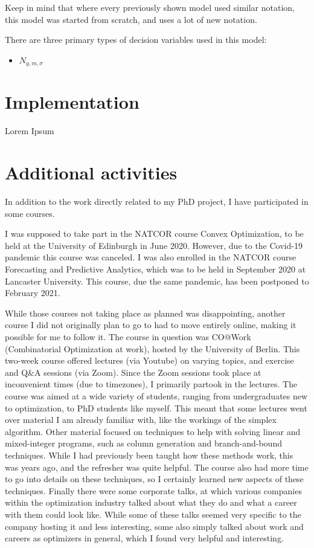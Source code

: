 \documentclass[a4paper,12pt]{article}
\begin{document}
Keep in mind that where every previously shown model used similar notation, this model was started from scratch, and uses a lot of new notation. 

There are three primary types of decision variables used in this model:

\begin{itemize}
\item $N_{y,m,\sigma}$ %
\end{itemize}

\pagebreak

\section{Implementation}\label{s:impl}
Lorem Ipsum 

\pagebreak

\section{Additional activities} \label{s:addit} %
In addition to the work directly related to my PhD project, I have participated in some courses. 

I was supposed to take part in the NATCOR course Convex Optimization, to be held at the University of Edinburgh in June 2020. However, due to the Covid-19 pandemic this course was canceled. I was also enrolled in the NATCOR course Forecasting and Predictive Analytics, which was to be held in September 2020 at Lancaster University. This course, due the same pandemic, has been postponed to February 2021. 

\bigskip

While those courses not taking place as planned was disappointing, another course I did not originally plan to go to had to move entirely online, making it possible for me to follow it. The course in question was CO@Work (Combinatorial Optimization at work), hosted by the University of Berlin. This two-week course offered lectures (via Youtube) on varying topics, and exercise and Q\&A sessions (via Zoom). Since the Zoom sessions took place at inconvenient times (due to timezones), I primarily partook in the lectures. The course was aimed at a wide variety of students, ranging from undergraduates new to optimization, to PhD students like myself. This meant that some lectures went over material I am already familiar with, like the workings of the simplex algorithm. Other material focused on techniques to help with solving linear and mixed-integer programs, such as column generation and branch-and-bound techniques. While I had previously been taught how these methods work, this was years ago, and the refresher was quite helpful. The course also had more time to go into details on these techniques, so I certainly learned new aspects of these techniques. Finally there were some corporate talks, at which various companies within the optimization industry talked about what they do and what a career with them could look like. While some of these talks seemed very specific to the company hosting it and less interesting, some also simply talked about work and careers as optimizers in general, which I found very helpful and interesting. 
\end{document}
